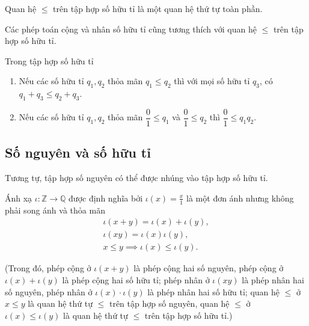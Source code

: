 \begin{theorem}
    Quan hệ $\leq$ trên tập hợp số hữu tỉ là một quan hệ thứ tự toàn phần.
\end{theorem}

Các phép toán cộng và nhân số hữu tỉ cũng tương thích với quan hệ $\leq$ trên tập hợp số hữu tỉ.
\begin{theorem}\label{theorem:rational-numbers-order-and-operations}
    Trong tập hợp số hữu tỉ
    \begin{enumerate}[label={(\roman*)}]
        \item Nếu các số hữu tỉ $q_{1}, q_{2}$ thỏa mãn $q_{1}\leq q_{2}$ thì với mọi số hữu tỉ $q_{3}$, có $q_{1} + q_{3}\leq q_{2} + q_{3}$.
        \item Nếu các số hữu tỉ $q_{1}, q_{2}$ thỏa mãn $\dfrac{0}{1}\leq q_{1}$ và $\dfrac{0}{1}\leq q_{2}$ thì $\dfrac{0}{1}\leq q_{1}q_{2}$.
    \end{enumerate}
\end{theorem}

\subsection{Số nguyên và số hữu tỉ}

Tương tự, tập hợp số nguyên có thể được nhúng vào tập hợp số hữu tỉ.
\begin{theorem}\label{theorem:embed-Z-into-Q}
    Ánh xạ $\iota: \mathbb{Z}\to \mathbb{Q}$ được định nghĩa bởi $\iota(x) = \frac{x}{1}$ là một đơn ánh nhưng không phải song ánh và thỏa mãn
    \[
        \begin{split}
            \iota(x + y) = \iota(x) + \iota(y), \\
            \iota(xy) = \iota(x)\iota(y), \\
            x\leq y \implies \iota(x)\leq \iota(y).
        \end{split}
    \]

    (Trong đó, phép cộng ở $\iota(x + y)$ là phép cộng hai số nguyên, phép cộng ở $\iota(x) + \iota(y)$ là phép cộng hai số hữu tỉ; phép nhân ở $\iota(xy)$ là phép nhân hai số nguyên, phép nhân ở $\iota(x)\cdot\iota(y)$ là phép nhân hai số hữu tỉ; quan hệ $\leq$ ở $x\leq y$ là quan hệ thứ tự $\leq$ trên tập hợp số nguyên, quan hệ $\leq$ ở $\iota(x)\leq \iota(y)$ là quan hệ thứ tự $\leq$ trên tập hợp số hữu tỉ.)
\end{theorem}


